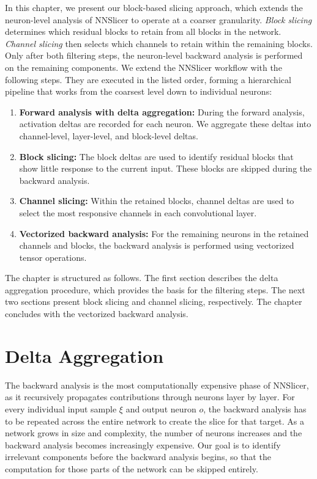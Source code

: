 \documentclass[
12pt,
fancyheadings,
a4paper,
twoside,
BCOR=0.7cm,
nobcorignoretitle,
grayscalebody,
]{stsreprt}
\begin{document}
In this chapter, we present our block-based slicing approach, which extends the neuron-level
analysis of NNSlicer to operate at a coarser granularity.
\textit{Block slicing} determines which residual blocks to retain from all blocks in the network. \textit{Channel slicing} then selects which channels to retain within the remaining blocks. Only after both filtering steps, the neuron-level backward analysis is performed on the remaining components.
We extend the NNSlicer workflow with the following steps. They are executed in the listed order,
forming a hierarchical pipeline that works from the coarsest level down to individual neurons:
\begin{enumerate}
    \item \textbf{Forward analysis with delta aggregation:}
        During the forward analysis, activation deltas are recorded for each neuron.
        We aggregate these deltas into channel-level, layer-level, and block-level deltas.
    \item \textbf{Block slicing:}
        The block deltas are used to identify residual blocks that show little response to the
    current input.
        These blocks are skipped during the backward analysis.
    \item \textbf{Channel slicing:}
        Within the retained blocks, channel deltas are used to select the most responsive channels
    in each convolutional layer.
    \item \textbf{Vectorized backward analysis:}
        For the remaining neurons in the retained channels and blocks, the backward analysis is
    performed using vectorized tensor operations.
\end{enumerate}

The chapter is structured as follows. The first section describes the delta aggregation procedure,
which provides the basis for the filtering steps. The next two sections present block slicing and
channel slicing, respectively. The chapter concludes with the vectorized backward analysis.

\section{Delta Aggregation}
\label{sec:delta_aggregation}

The backward analysis is the most computationally expensive phase of NNSlicer, as it recursively
propagates contributions
through neurons layer by layer.
For every individual input sample $\xi$ and output neuron $o$, the backward analysis has to be
repeated across the entire network to create the slice for that target.
As a network grows in size and complexity, the number of neurons increases and the backward
analysis becomes increasingly expensive. 
Our goal is to identify irrelevant components before the backward analysis begins, so that the
computation for those
parts of the network can be skipped entirely.
\end{document}
